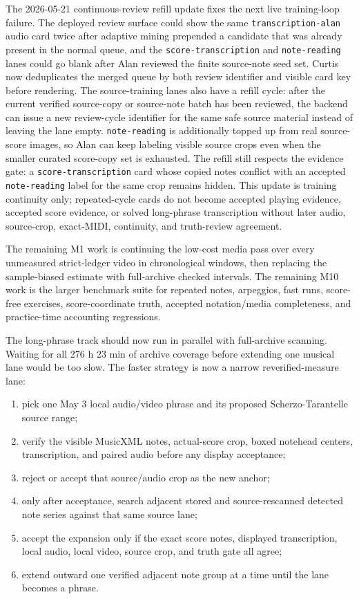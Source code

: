 The 2026-05-21 continuous-review refill update fixes the next live training-loop failure. The deployed review surface could show the same \texttt{transcription-alan} audio card twice after adaptive mining prepended a candidate that was already present in the normal queue, and the \texttt{score-transcription} and \texttt{note-reading} lanes could go blank after Alan reviewed the finite source-note seed set. Curtis now deduplicates the merged queue by both review identifier and visible card key before rendering. The source-training lanes also have a refill cycle: after the current verified source-copy or source-note batch has been reviewed, the backend can issue a new review-cycle identifier for the same safe source material instead of leaving the lane empty. \texttt{note-reading} is additionally topped up from real source-score images, so Alan can keep labeling visible source crops even when the smaller curated score-copy set is exhausted. The refill still respects the evidence gate: a \texttt{score-transcription} card whose copied notes conflict with an accepted \texttt{note-reading} label for the same crop remains hidden. This update is training continuity only; repeated-cycle cards do not become accepted playing evidence, accepted score evidence, or solved long-phrase transcription without later audio, source-crop, exact-MIDI, continuity, and truth-review agreement.

The remaining M1 work is continuing the low-cost media pass over every unmeasured strict-ledger video in chronological windows, then replacing the sample-biased estimate with full-archive checked intervals. The remaining M10 work is the larger benchmark suite for repeated notes, arpeggios, fast runs, score-free exercises, score-coordinate truth, accepted notation/media completeness, and practice-time accounting regressions.

The long-phrase track should now run in parallel with full-archive scanning. Waiting for all 276 h 23 min of archive coverage before extending one musical lane would be too slow. The faster strategy is now a narrow reverified-measure lane:
\begin{enumerate}
    \item pick one May 3 local audio/video phrase and its proposed Scherzo-Tarantelle source range;
    \item verify the visible MusicXML notes, actual-score crop, boxed notehead centers, transcription, and paired audio before any display acceptance;
    \item reject or accept that source/audio crop as the new anchor;
    \item only after acceptance, search adjacent stored and source-rescanned detected note series against that same source lane;
    \item accept the expansion only if the exact score notes, displayed transcription, local audio, local video, source crop, and truth gate all agree;
    \item extend outward one verified adjacent note group at a time until the lane becomes a phrase.
\end{enumerate}

